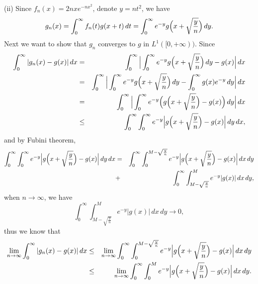 \documentclass[12pt,a4paper]{ctexart}
\begin{document}
\vspace{4pt}

(ii) Since $f_{n} (x) = 2 n x e^{-n x^{2}}$, denote $y = n t^{2}$, we have
\begin{equation*}
    g_{n} (x) = \int_{0}^{\infty} f_{n} (t) g(x + t) \, d t = \int_{0}^{\infty} e^{-y} g \Big{(} x + \sqrt{\frac{y}{n}} \Big{)} \, d y.
\end{equation*}
Next we want to show that $g_{n}$ converges to $g$ in $L^{1}([0, + \infty))$. Since
\begin{eqnarray*}
\int_{0}^{\infty} |g_{n}(x) - g(x)| \, d x & = &  \int_{0}^{\infty} \Big{|} \int_{0}^{\infty}  e^{-y} g \Big{(} x + \sqrt{\frac{y}{n}} \Big{)} \, d y  - g(x) \Big{|} \, d x \\
& = &  \int_{0}^{\infty} \Big{|} \int_{0}^{\infty}  e^{-y} g \Big{(} x + \sqrt{\frac{y}{n}} \Big{)} \, d y  - \int_{0}^{\infty} g(x) e^{-y} \, d y  \Big{|} \, d x  \\
& = &  \int_{0}^{\infty} \Big{|} \int_{0}^{\infty}  e^{-y} \Big{(} g \Big{(} x + \sqrt{\frac{y}{n}} \Big{)}  - g(x) \Big{)} \, d y \Big{|} \, d x \\
& \leq & \int_{0}^{\infty} \int_{0}^{\infty}  e^{-y} \Big{|} g \Big{(} x + \sqrt{\frac{y}{n}} \Big{)}  - g(x) \Big{|} \, d y \, d x,
\end{eqnarray*}
and by Fubini theorem,
\begin{eqnarray*}
\int_{0}^{\infty} \int_{0}^{\infty}  e^{-y} \Big{|} g \Big{(} x + \sqrt{\frac{y}{n}} \Big{)}  - g(x) \Big{|} \, d y \, d x & = &  \int_{0}^{\infty} \int_{0}^{M - \sqrt{\frac{y}{n}}}  e^{-y} \Big{|} g \Big{(} x + \sqrt{\frac{y}{n}} \Big{)}  - g(x) \Big{|} \, d x \, d y \\
& + & \int_{0}^{\infty} \int_{M - \sqrt{\frac{y}{n}}}^{M}  e^{-y} | g(x) | \, d x \, d y ,
\end{eqnarray*}
when $n \to \infty$, we have
\begin{equation*}
    \int_{0}^{\infty} \int_{M - \sqrt{\frac{y}{n}}}^{M}  e^{-y} | g(x) | \, d x \, d y \to  0 ,
\end{equation*}
thus we know that
\begin{eqnarray*}
 \lim_{n \to \infty} \int_{0}^{\infty} |g_{n}(x) - g(x)| \, d x  & \leq & \lim_{n \to \infty}  \int_{0}^{\infty} \int_{0}^{M - \sqrt{\frac{y}{n}}}  e^{-y} \Big{|} g \Big{(} x + \sqrt{\frac{y}{n}} \Big{)}  - g(x) \Big{|} \, d x \, d y \\
 & \leq & \lim_{n \to \infty}  \int_{0}^{\infty} \int_{0}^{M}  e^{-y} \Big{|} g \Big{(} x + \sqrt{\frac{y}{n}} \Big{)}  - g(x) \Big{|} \, d x \, d y.
\end{eqnarray*}
\end{document}
